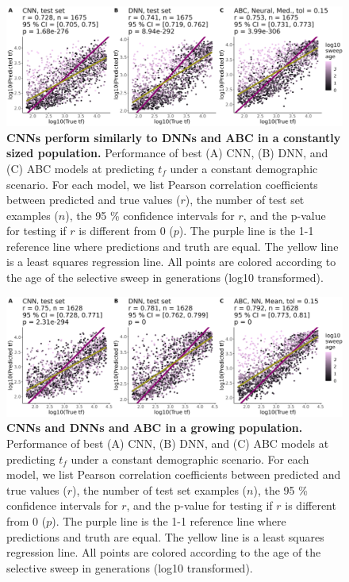 \documentclass[12pt]{article}
\begin{document}
\begin{figure}[H]
    \centering
    \includegraphics[width=\textwidth]{figures/chapter_4/best_models_constant_2025-03-04.png}
    \caption{\textbf{CNNs perform similarly to DNNs and ABC in a constantly sized population.} Performance of best (A) CNN, (B) DNN, and (C) ABC models at predicting $t_f$ under a constant demographic scenario. For each model, we list Pearson correlation coefficients between predicted and true values ($r$), the number of test set examples ($n$), the 95 \% confidence intervals for $r$, and the p-value for testing if $r$ is different from 0 ($p$). The purple line is the 1-1 reference line where predictions and truth are equal. The yellow line is a least squares regression line. All points are colored according to the age of the selective sweep in generations (log10 transformed).}
    \label{fig:perf_constant}
\end{figure}

\begin{figure}[H]
    \centering
    \includegraphics[width=\linewidth]{figures/chapter_4/best_models_growth_2025-03-05.png}
    \caption{\textbf{CNNs and DNNs and ABC in a growing population.} Performance of best (A) CNN, (B) DNN, and (C) ABC models at predicting $t_f$ under a constant demographic scenario. For each model, we list Pearson correlation coefficients between predicted and true values ($r$), the number of test set examples ($n$), the 95 \% confidence intervals for $r$, and the p-value for testing if $r$ is different from 0 ($p$). The purple line is the 1-1 reference line where predictions and truth are equal. The yellow line is a least squares regression line. All points are colored according to the age of the selective sweep in generations (log10 transformed).}
    \label{fig:perf_growth}
\end{figure}
\end{document}
